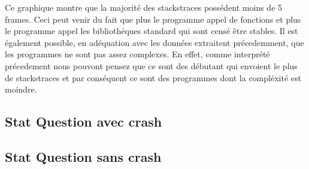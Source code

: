 Ce graphique montre que la majorité des stackstraces possédent moins de 5 frames. Ceci peut venir du fait que plus le programme appel de fonctions et plus le programme appel les bibliothéques standard qui sont censé être stables. Il est également possible, en adéquation avec les données extraitent précedemment, que les programmes ne sont pas assez complexes. En effet, comme interprété précedement nous pouvont pensez que ce sont des débutant qui envoient le plus de stackstraces et par conséquent ce sont des programmes dont la compléxité est moindre.  

\subsection{Stat Question avec crash}
\subsection{Stat Question sans crash}
